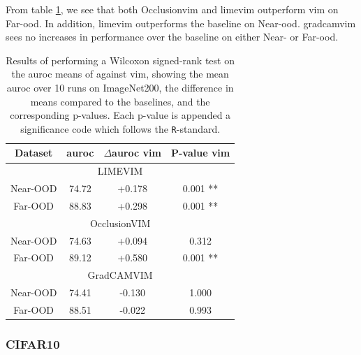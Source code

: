 \documentclass[UKenglish]{uiomasterthesis} %
\theoremstyle{definition}
\begin{document}
From table \ref{table:imagenet200_salvim_ttest}, we see that both Occlusion\ac{vim} and \ac{lime}\ac{vim} outperform \ac{vim} on Far-\ac{ood}. In addition, \ac{lime}\ac{vim} outperforms the baseline on Near-\ac{ood}. \ac{gradcam}\ac{vim} sees no increases in performance over the baseline on either Near- or Far-\ac{ood}.

\begin{table}[hbtp]
\setlength\tabcolsep{3pt}
\begin{center}
\begin{tabular}{ |c|c|c|c| }
    \hline
    Dataset & \ac{auroc} & $\Delta$\ac{auroc} \ac{vim} & P-value \ac{vim} \\
    \hline
    \hline
    \multicolumn{4}{|c|}{LIMEVIM} \\
    \hline
    \rowcolor{near!50}
    Near-OOD & 74.72 & +0.178 & 0.001 ** \\
    \rowcolor{far!50}
    Far-OOD & 88.83 & +0.298 & 0.001 ** \\
    \hline
    \hline
    \multicolumn{4}{|c|}{OcclusionVIM} \\
    \hline
    \rowcolor{near!50}
    Near-OOD & 74.63 & +0.094 & 0.312 \\
    \rowcolor{far!50}
    Far-OOD & 89.12 & +0.580 & 0.001 ** \\
    \hline
    \hline
    \multicolumn{4}{|c|}{GradCAMVIM} \\
    \hline
    \rowcolor{near!50}
    Near-OOD & 74.41 & -0.130 & 1.000 \\
    \rowcolor{far!50}
    Far-OOD & 88.51 & -0.022 & 0.993 \\
    \hline
    \end{tabular}
    \caption[Wilcoxon signed-rank test for SaliencyVIM on ImageNet200]{Results of performing a Wilcoxon signed-rank test on the \ac{auroc} means of against \ac{vim}, showing the mean \ac{auroc} over 10 runs on ImageNet200, the difference in means compared to the baselines, and the corresponding p-values. Each p-value is appended a significance code which follows the \texttt{R}-standard.}
    \label{table:imagenet200_salvim_ttest}
\end{center}
\setlength\tabcolsep{6pt}
\end{table}

\newpage

\subsubsection{CIFAR10}
\end{document}
